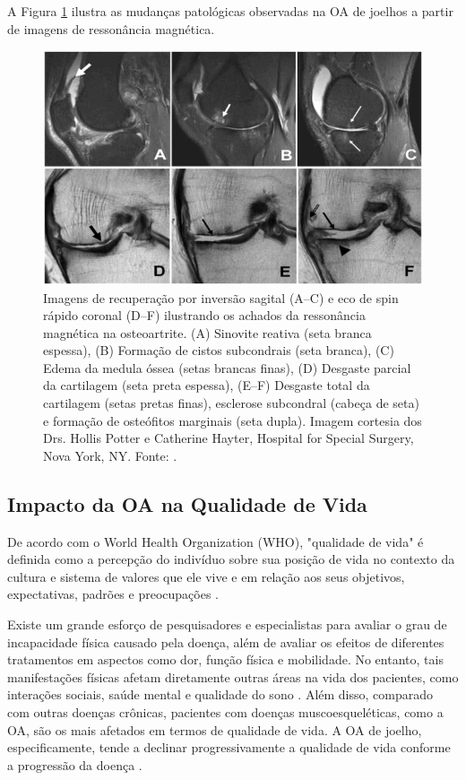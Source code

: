 A Figura \ref{fig:osteoartrite-joelho} ilustra as mudanças patológicas observadas na OA de joelhos a partir de imagens de ressonância magnética.

\begin{figure}[h]
    \centering
    \includegraphics[width=\linewidth]{figs/mud-patologicas-oa.jpg}
    \caption{Imagens de recuperação por inversão sagital (A–C) e eco de spin rápido coronal (D–F) ilustrando os achados da ressonância magnética na osteoartrite. (A) Sinovite reativa (seta branca espessa), (B) Formação de cistos subcondrais (seta branca), (C) Edema da medula óssea (setas brancas finas), (D) Desgaste parcial da cartilagem (seta preta espessa), (E–F) Desgaste total da cartilagem (setas pretas finas), esclerose subcondral (cabeça de seta) e formação de osteófitos marginais (seta dupla). Imagem cortesia dos Drs. Hollis Potter e Catherine Hayter, Hospital for Special Surgery, Nova York, NY. Fonte: \cite{Loeser2012}.}
    \label{fig:osteoartrite-joelho}
\end{figure}

\subsection{Impacto da OA na Qualidade de Vida}

De acordo com o World Health Organization (WHO), "qualidade de vida" é definida como a percepção do indivíduo sobre sua posição de vida no contexto da cultura e sistema de valores que ele vive e em relação aos seus objetivos, expectativas, padrões e preocupações \citep{who2012}.

Existe um grande esforço de pesquisadores e especialistas para avaliar o grau de incapacidade física causado pela doença, além de avaliar os efeitos de diferentes tratamentos em aspectos como dor, função física e mobilidade. No entanto, tais manifestações físicas afetam diretamente outras áreas na vida dos pacientes, como interações sociais, saúde mental e qualidade do sono \citep{Ferrel1992}. Além disso, comparado com outras doenças crônicas, pacientes com doenças muscoesqueléticas, como a OA, são os mais afetados em termos de qualidade de vida. A OA de joelho, especificamente, tende a declinar progressivamente a qualidade de vida conforme a progressão da doença \citep{Hoogeboom2013}.

